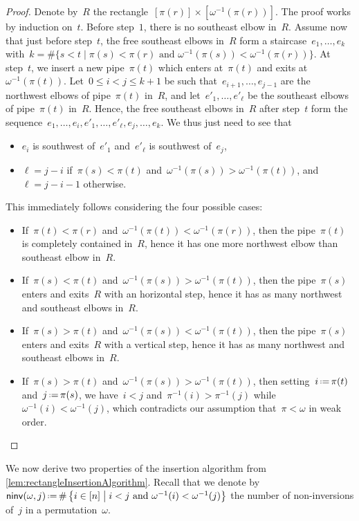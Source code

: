\documentclass{amsart}
\theoremstyle{definition}
\newcommand{\set}[2]{\left\{ #1 \;\middle|\; #2 \right\}} %
\newcommand{\bigset}[2]{\big\{ #1 \;|\; #2 \big\}} %
\newcommand{\eqdef}{\mbox{\,\raisebox{0.2ex}{\scriptsize\ensuremath{\mathrm:}}\ensuremath{=}\,}} %
\newcommand{\noninversions}[2]{\mathsf{ninv}(#1,#2)} %
\begin{document}
\begin{proof}
Denote by~$R$ the rectangle~$[\pi(r)] \times [\omega^{-1}(\pi(r))]$.
The proof works by induction on~$t$.
Before step~$1$, there is no southeast elbow in~$R$.
Assume now that just before step~$t$, the free southeast elbows in~$R$ form a staircase~$e_1, \dots, e_k$ with~$k = \# \bigset{{s < t}}{{\pi(s) < \pi(r)} \text{ and } {\omega^{-1}(\pi(s)) < \omega^{-1}(\pi(r))}}$.
At step~$t$, we insert a new pipe~$\pi(t)$ which enters at~$\pi(t)$ and exits at~$\omega^{-1}(\pi(t))$.
Let~${0 \le i < j \le k+1}$ be such that~$e_{i+1}, \dots, e_{j-1}$ are the northwest elbows of pipe~$\pi(t)$ in~$R$, and let~$e'_1, \dots, e'_\ell$ be the southeast elbows of pipe~$\pi(t)$ in~$R$.
Hence, the free southeast elbows in~$R$ after step~$t$ form the sequence~$e_1, \dots, e_i, e'_1, \dots, e'_\ell, e_j, \dots, e_k$.
We thus just need to see that
\begin{itemize}
\item $e_i$ is southwest of~$e'_1$ and~$e'_\ell$ is southwest of~$e_j$,
\item $\ell = j-i$ if~$\pi(s) < \pi(t)$ and~$\omega^{-1}(\pi(s)) > \omega^{-1}(\pi(t))$, and $\ell = j-i-1$ otherwise.
\end{itemize}
This immediately follows considering the four possible cases:
\begin{itemize}
\item If~$\pi(t) < \pi(r)$ and~$\omega^{-1}(\pi(t)) < \omega^{-1}(\pi(r))$, then the pipe~$\pi(t)$ is completely contained in~$R$, hence it has one more northwest elbow than southeast elbow in~$R$.
\item If~$\pi(s) < \pi(t)$ and~$\omega^{-1}(\pi(s)) > \omega^{-1}(\pi(t))$, then the pipe~$\pi(s)$ enters and exits~$R$ with an horizontal step, hence it has as many northwest and southeast elbows in~$R$.
\item If~$\pi(s) > \pi(t)$ and~$\omega^{-1}(\pi(s)) < \omega^{-1}(\pi(t))$, then the pipe~$\pi(s)$ enters and exits~$R$ with a vertical step, hence it has as many northwest and southeast elbows in~$R$.
\item If~$\pi(s) > \pi(t)$ and~$\omega^{-1}(\pi(s)) > \omega^{-1}(\pi(t))$, then setting~$i \eqdef \pi(t)$ and~$j \eqdef \pi(s)$, we have~${i < j}$ and~$\pi^{-1}(i) > \pi^{-1}(j)$ while~$\omega^{-1}(i) < \omega^{-1}(j)$, which contradicts our assumption that~$\pi < \omega$ in weak order. \qedhere
\end{itemize}
\end{proof}

We now derive two properties of the insertion algorithm from \cref{lem:rectangleInsertionAlgorithm}.
Recall that we denote by~$\noninversions{\omega}{j} \eqdef \#\set{i \in [n]}{i < j \text{ and } \omega^{-1}(i) < \omega^{-1}(j)}$ the number of non-inversions of~$j$ in a permutation~$\omega$.
\end{document}
